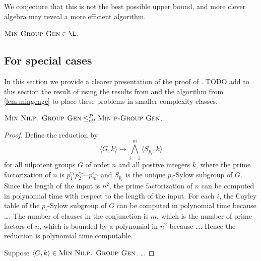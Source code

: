 \documentclass{article}
\begin{document}


We conjecture that this is not the best possible upper bound, and more clever algebra may reveal a more efficient algorithm.

\begin{conjecture}
  $\textsc{Min Group Gen} \in \L$.
\end{conjecture}

\subsection{For special cases}

In this section we provide a clearer presentation of the proof of \cite[Theorem~7]{at06}.
TODO add to this section the result of using the results from \cite{bklm01} and the algorithm from \autoref{lem:mingengc} to place these problems in smaller complexity classes.

\begin{proposition}
  $\textsc{Min Nilp. Group Gen} \leq_{ctt}^P \textsc{Min p-Group Gen}$.
\end{proposition}
\begin{proof}
  Define the reduction by
  \begin{equation*}
    \langle G, k \rangle \mapsto \bigwedge_{i=1}^m \langle S_{p_i}, k \rangle
  \end{equation*}
  for all nilpotent groups $G$ of order $n$ and all postive integers $k$, where the prime factorization of $n$ is $p_1^{e_1}p_2^{e_2}\dotsb p_m^{e_m}$ and $S_{p_i}$ is the unique $p_i$-Sylow subgroup of $G$.
  Since the length of the input is $n^2$, the prime factorization of $n$ can be computed in polynomial time with respect to the length of the input.
  For each $i$, the Cayley table of the $p_i$-Sylow subgroup of $G$ can be computed in polynomial time because \ldots.
  The number of clauses in the conjunction is $m$, which is the number of prime factors of $n$, which is bounded by a polynomial in $n^2$ because \ldots.
  Hence the reduction is polynomial time computable.

  Suppose $\langle G, k \rangle \in \textsc{Min Nilp. Group Gen}$.
  \ldots
\end{proof}
\end{document}
